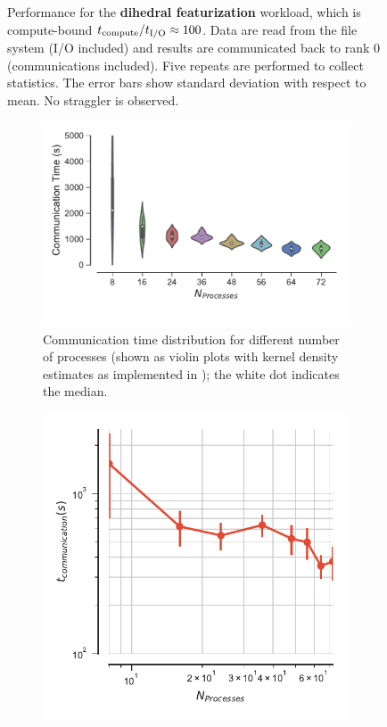 \begin{figure}[ht!]
\caption{Performance for the \textbf{dihedral featurization} workload,
which is compute-bound ${t}_{\text{compute}}/{t}_{\text{I/O}} \approx 100$. Data are read from the file system (I/O included) 
and results are communicated back to rank 0 (communications included). Five repeats are performed to collect statistics. 
The error bars show standard deviation with respect to mean. No straggler is observed.} 
\label{fig:MPIwithIO-dihed}
\end{figure} 

\begin{figure}[ht!]
\begin{subfigure} {.55\textwidth}
  \centering
  \includegraphics[width=\linewidth]{figures/ViolinPlot-Ncores-comparison-comm-dihedral.pdf}
  \caption{Communication time distribution for different number of
    processes (shown as violin plots \protect\cite{Hintze:1998tw}
    with kernel density estimates as implemented in
    ); the white dot indicates the median.}
\end{subfigure}
\hfill
\begin{subfigure}{.35\textwidth}
  \centering
  \includegraphics[width=\linewidth]{figures/t_comm_mean-dihedral.pdf}

\end{subfigure}
\end{figure}
